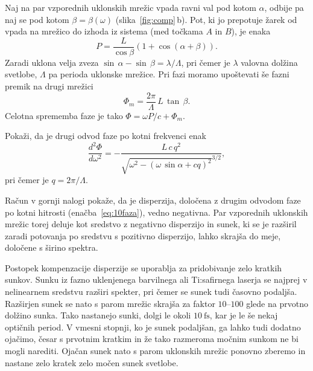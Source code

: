 Naj na par vzporednih uklonskih mrežic vpada ravni val pod kotom $\alpha$, odbije
pa naj se pod kotom $\beta = \beta(\omega)$ (slika~\ref{fig:comp}\,b). 
Pot, ki jo prepotuje žarek od vpada na mrežico 
do izhoda iz sistema (med točkama $A$ in $B$), je enaka 
\begin{equation}
P = \frac{L}{\cos\beta} \left(1+\cos(\alpha + \beta)\right).
\end{equation}
Zaradi uklona velja zveza $\sin\,\alpha - \sin\,\beta = \lambda/\Lambda$,
pri čemer je $\lambda$ valovna dolžina svetlobe, $\Lambda$ pa perioda uklonske mrežice. 
Pri fazi moramo upoštevati še fazni premik na drugi mrežici
\begin{equation}
\Phi_m=\frac{2\pi}{\Lambda} \, L \, \tan\,\beta.
\end{equation}
Celotna sprememba faze je tako $\Phi = \omega P/c + \Phi_m$.

\begin{definition}
Pokaži, da je drugi odvod faze po kotni frekvenci enak
\begin{equation}
\frac{d^2 \Phi}{d \omega^2} = - \frac{L\, c\, q^2}
{\sqrt{\omega^2 - (\omega\, \sin\alpha + cq)^2}^{3/2}},
\label{eq:10faza}
\end{equation}
pri čemer je $q = 2 \pi/\Lambda$.
\end{definition}
Račun v gornji nalogi pokaže, da je disperzija, določena z drugim odvodom faze po kotni hitrosti 
(enačba~\ref{eq:10faza}), vedno negativna. Par vzporednih uklonskih mrežic torej deluje kot sredstvo
z negativno disperzijo in sunek, ki se je razširil zaradi potovanja
po sredstvu s pozitivno disperzijo, lahko skrajša do meje,
določene s širino spektra. 

\begin{remark}
Postopek kompenzacije disperzije se uporablja za pridobivanje zelo 
kratkih sunkov. Sunku iz fazno uklenjenega barvilnega 
ali Ti:safirnega
laserja se najprej v nelinearnem sredstvu razširi spekter, pri čemer
se sunek tudi časovno podaljša. Razširjen sunek se nato s parom mrežic skrajša
za faktor $10$--$100$ glede na prvotno dolžino sunka. Tako nastanejo sunki,
dolgi le okoli $10~\si{\femto\second}$, kar je le še nekaj optičnih period. 
V vmesni stopnji, ko je sunek podaljšan, ga lahko tudi dodatno ojačimo, česar
s prvotnim kratkim in že tako razmeroma močnim sunkom ne bi mogli narediti. Ojačan
sunek nato s parom uklonskih mrežic ponovno zberemo in nastane zelo kratek
zelo močen sunek svetlobe.
\end{remark}

